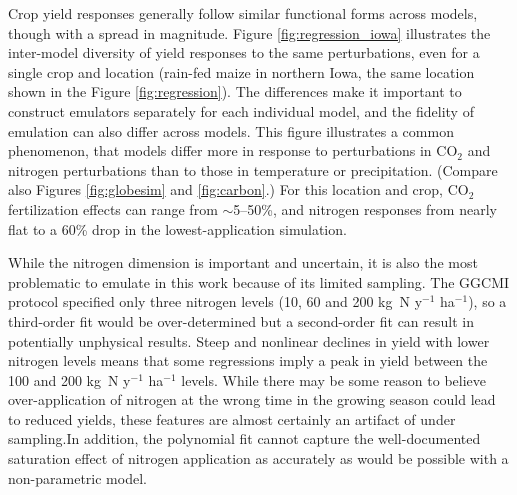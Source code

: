 \documentclass[preprint, 5p, times, twocolumn]{elsarticle}
\begin{document}
{Crop yield responses generally follow similar functional forms across models, though with a spread in magnitude. Figure \ref{fig:regression_iowa} illustrates the inter-model diversity of yield responses to the same perturbations, even for a single crop and location (rain-fed maize in northern Iowa, the same location shown in the Figure \ref{fig:regression}). The differences make it important to construct emulators separately for each individual model, and the fidelity of emulation can also differ across models. This figure illustrates a common phenomenon, that models differ more in response to perturbations in CO$_2$ and nitrogen perturbations than to those in temperature or precipitation. (Compare also Figures \ref{fig:globesim} and \ref{fig:carbon}.) For this location and crop, CO$_2$ fertilization effects can range from $\sim$5--50\%, and nitrogen responses from nearly flat to a 60\% drop in the lowest-application simulation. 

While the nitrogen dimension is important and uncertain, it is also the most problematic to emulate in this work because of its limited sampling. The GGCMI protocol specified only three nitrogen levels (10, 60 and 200 kg~N y$^{-1}$ ha$^{-1}$), so a third-order fit would be over-determined but a second-order fit can result in potentially unphysical results. Steep and nonlinear declines in yield with lower nitrogen levels means that some regressions imply a peak in yield between the 100 and 200 kg~N y$^{-1}$ ha$^{-1}$ levels. While there may be some reason to believe over-application of nitrogen at the wrong time in the growing season could lead to reduced yields, these features are almost certainly an artifact of under sampling.In addition, the polynomial fit cannot capture the well-documented saturation effect of nitrogen application \citep[e.g.][]{Torsten77} as accurately as would be possible with a non-parametric model. 

}
\end{document}
